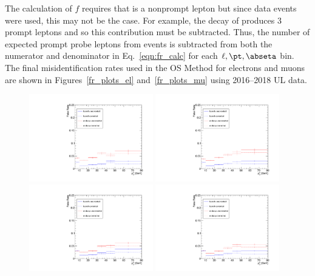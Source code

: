 The calculation of $f$ requires that \looselep is a nonprompt lepton but since data events were used, this may not be the case.
For example, the decay of \WZ produces 3 prompt leptons and so this contribution must be subtracted.
Thus, the number of expected prompt probe leptons from \WZ events is subtracted from both the numerator and denominator in Eq.~\ref{eqn:fr_calc} for each $\ell, \pt, \abseta$ bin.
The final misidentification rates used in the OS Method for electrons and muons are shown in Figures~\ref{fr_plots_el} and~\ref{fr_plots_mu} using 2016--2018 UL data.
\begin{figure}[!htbp]
	\begin{center}
		\includegraphics[width=0.48\textwidth]{figures/higgsmassmeas/redbkg/fr/fakerates_UL2016preVFP_el_yaxis_full.pdf}
		\includegraphics[width=0.48\textwidth]{figures/higgsmassmeas/redbkg/fr/fakerates_UL2016postVFP_el_yaxis_full.pdf}
		\includegraphics[width=0.48\textwidth]{figures/higgsmassmeas/redbkg/fr/fakerates_UL2017_el_yaxis_full.pdf}
		\includegraphics[width=0.48\textwidth]{figures/higgsmassmeas/redbkg/fr/fakerates_UL2018_el_yaxis_full.pdf}

\end{center}
\end{figure}
